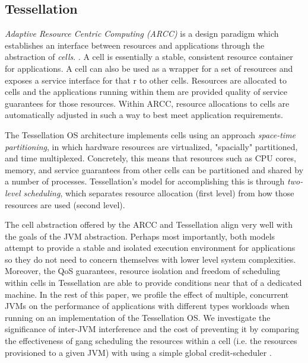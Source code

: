\documentclass{sig-alternate}
\begin{document}
\subsection{Tessellation}

\textit{Adaptive Resource Centric Computing (ARCC)} is a design paradigm which establishes an interface between resources and applications through the abstraction of \textit{cells}.  \cite{colmenares2013tessellation}. A cell is essentially a stable, consistent resource container for applications. A cell can also be used as a wrapper for a set of resources and exposes a service interface for that r to other cells. Resources are allocated to cells and the applications running within them are provided quality of service guarantees for those resources. Within ARCC, resource allocations to cells are automatically adjusted in such a way to best meet application requirements.

The Tessellation OS architecture \cite{colmenares2010resource, colmenares2013tessellation, liu2009tessellation} implements cells using an approach \textit{space-time partitioning}, in which hardware resources are virtualized, "spacially" partitioned, and time multiplexed. Concretely, this means that resources such as CPU cores, memory, and service guarantees from other cells can be partitioned and shared by a number of processes. Tessellation's model for accomplishing this is through \textit{two-level scheduling}, which separates resource allocation (first level) from how those resources are used (second level).

The cell abstraction offered by the ARCC and Tessellation align very well with the goals of the JVM abstraction. Perhaps most importantly, both models attempt to provide a stable and isolated execution environment for applications so they do not need to concern themselves with lower level system complexities. Moreover, the QoS guarantees, resource isolation and freedom of scheduling within cells in Tessellation are able to provide conditions near that of a dedicated machine. In the rest of this paper, we profile the effect of multiple, concurrent JVMs on the performance of applications with different types workloads when running on an implementation of the Tessellation OS. We investigate the significance of inter-JVM interference and the cost of preventing it by comparing the effectiveness of gang scheduling the resources within a cell (i.e. the resources provisioned to a given JVM) with using a simple global credit-scheduler \cite{ackaouy2006xen}.
\end{document}
